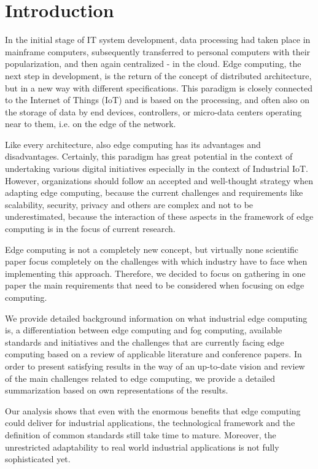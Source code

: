 \section{Introduction}\label{sec:introduction}
In the initial stage of IT system development, data processing had taken place in mainframe computers, subsequently transferred to personal computers with their popularization, and then again centralized - in the cloud. Edge computing, the next step in development, is the return of the concept of distributed architecture, but in a new way with different specifications. This paradigm is closely connected to the Internet of Things (IoT) and is based on the processing, and often also on the storage of data by end devices, controllers, or micro-data centers operating near to them, i.e. on the edge of the network.\par 
Like every architecture, also edge computing has its advantages and disadvantages. Certainly, this paradigm has great potential in the context of undertaking various digital initiatives especially in the context of Industrial IoT. However, organizations should follow an accepted and well-thought strategy when adapting edge computing, because the current challenges and requirements like scalability, security, privacy and others are complex and not to be underestimated, because the interaction of these aspects in the framework of edge computing is in the focus of current research.\par
Edge computing is not a completely new concept, but virtually none scientific paper focus completely on the challenges with which industry have to face when implementing this approach. Therefore, we decided to focus on gathering in one paper the main requirements that need to be considered when focusing on edge computing. \par
We provide detailed background information on what industrial edge computing is, a differentiation between edge computing and fog computing, available standards and initiatives and the challenges that are currently facing edge computing based on a review of applicable literature and conference papers. In order to present satisfying results in the way of an up-to-date vision and review of the main challenges related to edge computing, we provide a detailed summarization based on own representations of the results. \par
Our analysis shows that even with the enormous benefits that edge computing could deliver for industrial applications, the technological framework and the definition of common standards still take time to mature. Moreover, the unrestricted adaptability to real world industrial applications is not fully sophisticated yet.\par 
